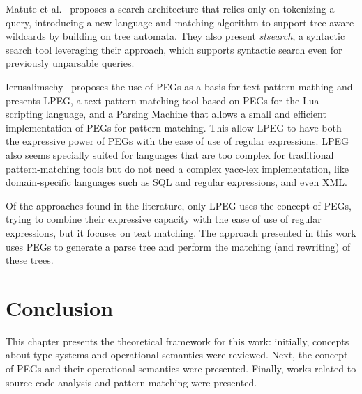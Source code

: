 Matute et al.~\cite{matute2024-sequence-tree-matching} proposes a search
architecture that relies only on tokenizing a query, introducing a new
language and matching algorithm to support tree-aware wildcards by building
on tree automata. They also present \textit{stsearch}, a syntactic search
tool leveraging their approach, which supports syntactic search even for
previously unparsable queries.

Ierusalimschy~\cite{ierusalimschy2009-lpeg} proposes the use of PEGs as a basis
for text pattern-mathing and presents LPEG, a text pattern-matching tool based on
PEGs for the Lua scripting language, and a Parsing Machine that allows a small
and efficient implementation of PEGs for pattern matching.
This allow LPEG to have both the expressive power of PEGs with the ease of use
of regular expressions.
LPEG also seems specially suited for languages that are too complex for
traditional pattern-matching tools but do not need a complex yacc-lex
implementation, like domain-specific languages such as SQL and regular
expressions, and even XML.

Of the approaches found in the literature, only LPEG uses the concept of PEGs,
trying to combine their expressive capacity with the ease of use of regular
expressions, but it focuses on text matching. The approach presented in this
work uses PEGs to generate a parse tree and perform the matching (and rewriting)
of these trees.

\section{Conclusion}\label{sec:background-conclusion}

This chapter presents the theoretical framework for this work: initially, concepts
about type systems and operational semantics were reviewed. Next, the concept
of PEGs and their operational semantics were presented. Finally, works related
to source code analysis and pattern matching were presented.

\cleardoublepage
